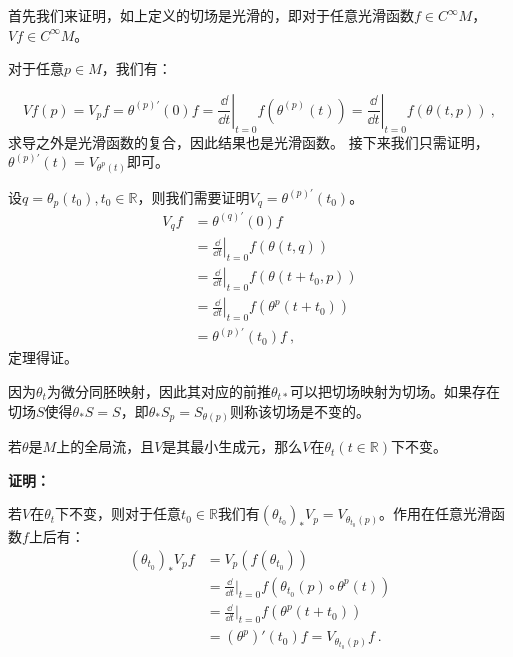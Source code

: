 首先我们来证明，如上定义的切场是光滑的，即对于任意光滑函数$f\in C^{\infty}M$，$Vf\in C^{\infty}M$。

对于任意$p\in M$，我们有：

\begin{equation}
Vf(p)=V_pf=\theta^{(p)\prime}(0)f=\left.\frac{\dd}{\dd t}\right|_{t=0} f\left(\theta^{(p)}(t)\right)=\left.\frac{\dd}{\dd t}\right|_{t=0} f(\theta(t, p)) ~,
\end{equation}
求导之外是光滑函数的复合，因此结果也是光滑函数。
接下来我们只需证明，$\theta^{(p) \prime}(t)=V_{\theta^{p}(t)}$即可。

设$q=\theta_p(t_0),t_0\in \mathbb R$，则我们需要证明$V_q=\theta^{(p)\prime}(t_0)$。
\begin{equation}
\begin{aligned}
V_qf&=\theta^{(q)\prime}(0)f\\
&=\left.\frac{\dd}{\dd t}\right|_{t=0} f(\theta(t, q))\\
&=\left.\frac{\dd}{\dd t}\right|_{t=0} f(\theta(t+t_0, p))\\
&=\left.\frac{\dd}{\dd t}\right|_{t=0} f(\theta^p(t+t_0))\\
&=\theta^{(p)\prime}(t_0)f~,
\end{aligned}
\end{equation}
定理得证。

因为$\theta_t$为微分同胚映射，因此其对应的前推$\theta_{t*}$可以把切场映射为切场。如果存在切场$S$使得$\theta_*S=S$，即$\theta_*S_p=S_{\theta(p)}
$则称该切场是不变的。

\begin{theorem}{}
若$\theta$是$M$上的全局流，且$V$是其最小生成元，那么$V$在$\theta_t(t\in \mathbb R)$下不变。
\end{theorem}
\textbf{证明：}

若$V$在$\theta_t$下不变，则对于任意$t_0\in\mathbb R$我们有$(\theta_{t_0})_*V_p=V_{\theta_{t_0}(p)}$。作用在任意光滑函数$f$上后有：
\begin{equation}
\begin{aligned}
(\theta_{t_0})_*V_pf&=V_p(f(\theta_{t_0}))\\
&=\frac{\dd}{\dd t}|_{t=0}f(\theta_{t_0}(p)\circ\theta^p(t))\\
&=\frac{\dd}{\dd t}|_{t=0}f(\theta^p(t+t_0))\\
&=(\theta^p)'(t_0)f=V_{\theta_{t_0}(p)}f~.
\end{aligned}
\end{equation}

